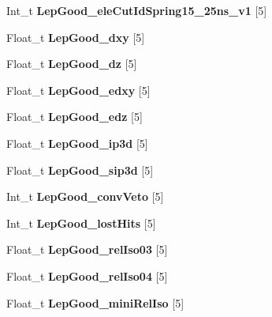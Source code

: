 \begin{DoxyCompactItemize}
Int\+\_\+t {\bfseries Lep\+Good\+\_\+ele\+Cut\+Id\+Spring15\+\_\+25ns\+\_\+v1} \mbox{[}5\mbox{]}
\item 
\hypertarget{classMiniTree_aa2cfaa834576365d5c685140fe33627b}{}\label{classMiniTree_aa2cfaa834576365d5c685140fe33627b} 
Float\+\_\+t {\bfseries Lep\+Good\+\_\+dxy} \mbox{[}5\mbox{]}
\item 
\hypertarget{classMiniTree_a1958b0b9762d0cf2cb880411450fba2e}{}\label{classMiniTree_a1958b0b9762d0cf2cb880411450fba2e} 
Float\+\_\+t {\bfseries Lep\+Good\+\_\+dz} \mbox{[}5\mbox{]}
\item 
\hypertarget{classMiniTree_a4ec75019f348ac5e354f33d3fdd93219}{}\label{classMiniTree_a4ec75019f348ac5e354f33d3fdd93219} 
Float\+\_\+t {\bfseries Lep\+Good\+\_\+edxy} \mbox{[}5\mbox{]}
\item 
\hypertarget{classMiniTree_a824b6fa7ded7d0216c4526da61b989c1}{}\label{classMiniTree_a824b6fa7ded7d0216c4526da61b989c1} 
Float\+\_\+t {\bfseries Lep\+Good\+\_\+edz} \mbox{[}5\mbox{]}
\item 
\hypertarget{classMiniTree_a0758d33cf3b1feaa2d4d2698a5ef1d70}{}\label{classMiniTree_a0758d33cf3b1feaa2d4d2698a5ef1d70} 
Float\+\_\+t {\bfseries Lep\+Good\+\_\+ip3d} \mbox{[}5\mbox{]}
\item 
\hypertarget{classMiniTree_a0e4a7c62481ca2e38abe1f6b465fe666}{}\label{classMiniTree_a0e4a7c62481ca2e38abe1f6b465fe666} 
Float\+\_\+t {\bfseries Lep\+Good\+\_\+sip3d} \mbox{[}5\mbox{]}
\item 
\hypertarget{classMiniTree_a1a2e920cca39b36d53b51f528515668e}{}\label{classMiniTree_a1a2e920cca39b36d53b51f528515668e} 
Int\+\_\+t {\bfseries Lep\+Good\+\_\+conv\+Veto} \mbox{[}5\mbox{]}
\item 
\hypertarget{classMiniTree_afe89d7e6c8dc31958b3d988c3a2e7f23}{}\label{classMiniTree_afe89d7e6c8dc31958b3d988c3a2e7f23} 
Int\+\_\+t {\bfseries Lep\+Good\+\_\+lost\+Hits} \mbox{[}5\mbox{]}
\item 
\hypertarget{classMiniTree_aef6f8ce922c22924ac88604addc1b415}{}\label{classMiniTree_aef6f8ce922c22924ac88604addc1b415} 
Float\+\_\+t {\bfseries Lep\+Good\+\_\+rel\+Iso03} \mbox{[}5\mbox{]}
\item 
\hypertarget{classMiniTree_a5065cfc4e0ff9b3c3e32537093548692}{}\label{classMiniTree_a5065cfc4e0ff9b3c3e32537093548692} 
Float\+\_\+t {\bfseries Lep\+Good\+\_\+rel\+Iso04} \mbox{[}5\mbox{]}
\item 
\hypertarget{classMiniTree_ae4776ffe8402585fc147d0472bdeb51d}{}\label{classMiniTree_ae4776ffe8402585fc147d0472bdeb51d} 
Float\+\_\+t {\bfseries Lep\+Good\+\_\+mini\+Rel\+Iso} \mbox{[}5\mbox{]}

\end{DoxyCompactItemize}
